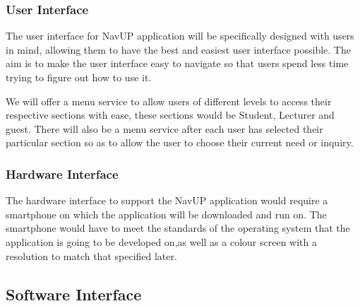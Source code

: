 \subsubsection{User Interface}
The user interface for NavUP application will be specifically designed with users in mind, allowing them to have the best and easiest user interface possible. The aim is to make the user interface easy to navigate so that users spend less time trying to figure out how to use it.

We will offer a menu service to allow users of different levels to access their respective sections with ease, these sections would be Student, Lecturer and guest. There will also be a menu service after each user has selected their particular section so as to allow the user to choose their current need or inquiry. 

\subsubsection{Hardware Interface}
The hardware interface to support the NavUP application would require a smartphone on which the application will be downloaded and run on. The smartphone would have to meet the standards of the operating system that the application is going to be developed on,as well as a colour screen with a resolution to match that specified later. 

\subsection{Software Interface}